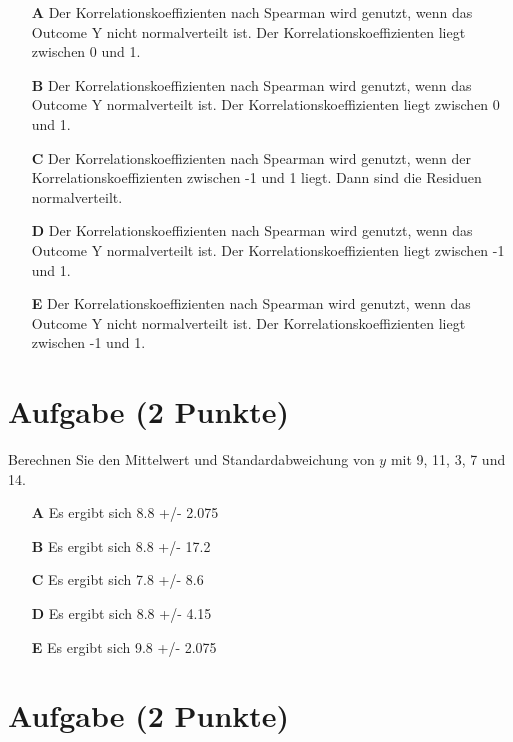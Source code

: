 \documentclass[a4paper, 10pt]{scrartcl}\usepackage[]{graphicx}\usepackage[]{xcolor}
\begin{document}
\begin{enumerate}
\item [\textbf{A} \msquare] Der Korrelationskoeffizienten nach Spearman wird genutzt, wenn das Outcome Y nicht normalverteilt ist. Der Korrelationskoeffizienten liegt zwischen 0 und 1.
\item [\textbf{B} \msquare] Der Korrelationskoeffizienten nach Spearman wird genutzt, wenn das Outcome Y normalverteilt ist. Der Korrelationskoeffizienten liegt zwischen 0 und 1.
\item [\textbf{C} \msquare] Der Korrelationskoeffizienten nach Spearman wird genutzt, wenn der Korrelationskoeffizienten zwischen -1 und 1 liegt. Dann sind die Residuen normalverteilt.
\item [\textbf{D} \msquare] Der Korrelationskoeffizienten nach Spearman wird genutzt, wenn das Outcome Y normalverteilt ist. Der Korrelationskoeffizienten liegt zwischen -1 und 1.
\item [\textbf{E} \msquare] Der Korrelationskoeffizienten nach Spearman wird genutzt, wenn das Outcome Y nicht normalverteilt ist. Der Korrelationskoeffizienten liegt zwischen -1 und 1.
\end{enumerate} 

\section{Aufgabe \hfill (2 Punkte)}




Berechnen Sie den Mittelwert und Standardabweichung von $y$ mit 9, 11, 3, 7 und 14.



\begin{enumerate}
\item [\textbf{A} \msquare] Es ergibt sich 8.8 +/- 2.075
\item [\textbf{B} \msquare] Es ergibt sich 8.8 +/- 17.2
\item [\textbf{C} \msquare] Es ergibt sich 7.8 +/- 8.6
\item [\textbf{D} \msquare] Es ergibt sich 8.8 +/- 4.15
\item [\textbf{E} \msquare] Es ergibt sich 9.8 +/- 2.075
\end{enumerate} 

\section{Aufgabe \hfill (2 Punkte)}
\end{document}
